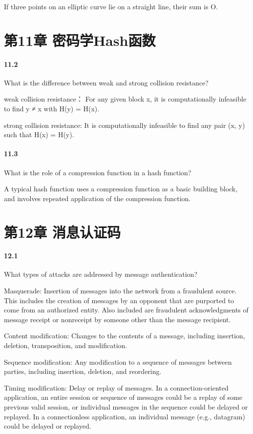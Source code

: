 \documentclass[UTF8]{article}
\begin{document}
If three points on an elliptic curve lie on a straight line, their sum is O.

\section{第11章 密码学Hash函数}
\paragraph{11.2}
What is the difference between weak and strong collision resistance?

weak collision resistance：	For any given block x, it is computationally infeasible to find y ≠ x with H(y) = H(x).

	strong collision resistance:	It is computationally infeasible to find any pair (x, y) such that H(x) = H(y).

\paragraph{11.3}
What is the role of a compression function in a hash function?

A typical hash function uses a compression function as a basic building block, and involves repeated application of the compression function.

\section{第12章 消息认证码}
\paragraph{12.1}
What types of attacks are addressed by message authentication?

Masquerade: Insertion of messages into the network from a fraudulent source. This includes the creation of messages by an opponent that are purported to come from an authorized entity. Also included are fraudulent acknowledgments of message receipt or nonreceipt by someone other than the message recipient. 

Content modification: Changes to the contents of a message, including insertion, deletion, transposition, and modification. 

Sequence modification: Any modification to a sequence of messages between parties, including insertion, deletion, and reordering.

Timing modification: Delay or replay of messages. In a connection-oriented application, an entire session or sequence of messages could be a replay of some previous valid session, or individual messages in the sequence could be delayed or replayed. In a connectionless application, an individual message (e.g., datagram) could be delayed or replayed.
\end{document}
